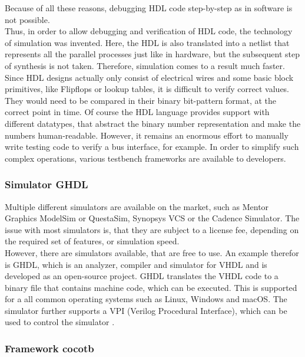 Because of all these reasons, debugging HDL code step-by-step as in software is not possible.\\

Thus, in order to allow debugging and verification of HDL code, the technology of simulation was invented.
Here, the HDL is also translated into a netlist that represents all the parallel processes just like in hardware, but the subsequent step of synthesis is not taken.
Therefore, simulation comes to a result much faster.
Since HDL designs actually only consist of electrical wires and some basic block primitives, like Flipflops or lookup tables, it is difficult to verify correct values.
They would need to be compared in their binary bit-pattern format, at the correct point in time.
Of course the HDL language provides support with different datatypes, that abstract the binary number representation and make the numbers human-readable.
However, it remains an enormous effort to manually write testing code to verify a bus interface, for example.
In order to simplify such complex operations, various testbench frameworks are available to developers.

\subsubsection{Simulator GHDL}

Multiple different simulators are available on the market, such as Mentor Graphics ModelSim or QuestaSim, Synopsys VCS or the Cadence Simulator.
The issue with most simulators is, that they are subject to a license fee, depending on the required set of features, or simulation speed.\\

However, there are simulators available, that are free to use.
An example therefor is GHDL, which is an analyzer, compiler and simulator for VHDL and is developed as an open-source project.
GHDL translates the VHDL code to a binary file that contains machine code, which can be executed.
This is supported for a all common operating systems such as Linux, Windows and macOS.
The simulator further supports a VPI (Verilog Procedural Interface), which can be used to control the simulator \cite{GHDLDoc}.

\subsubsection{Framework cocotb}
\label{sub:VHDL:FrameworkCocotb}

